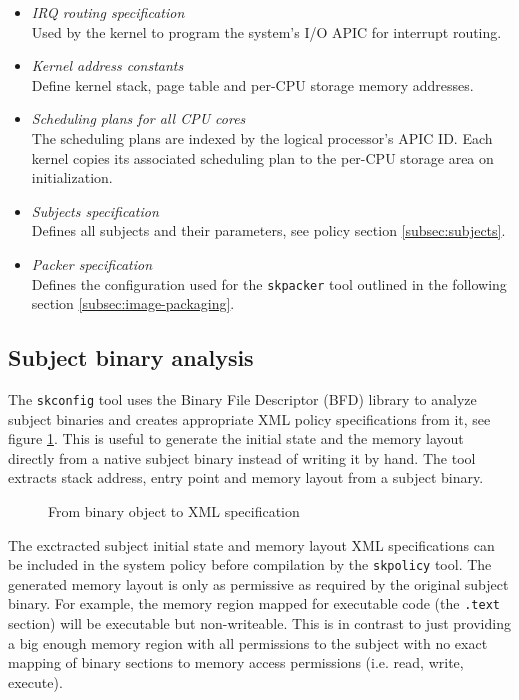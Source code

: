 \begin{itemize}
	\item \emph{IRQ routing specification}\\
		Used by the kernel to program the system's I/O APIC for interrupt
		routing.
	\item \emph{Kernel address constants}\\
		Define kernel stack, page table and per-CPU storage memory addresses.
	\item \emph{Scheduling plans for all CPU cores}\\
		The scheduling plans are indexed by the logical processor's APIC ID.
		Each kernel copies its associated scheduling plan to the per-CPU storage
		area on initialization.
	\item \emph{Subjects specification}\\
		Defines all subjects and their parameters, see policy section
		\ref{subsec:subjects}.
	\item \emph{Packer specification}\\
		Defines the configuration used for the \texttt{skpacker} tool outlined
		in the following section \ref{subsec:image-packaging}.
\end{itemize}

\subsection{Subject binary analysis}\label{subsec:subject-binary-analysis}
The \texttt{skconfig} tool uses the Binary File Descriptor (BFD)
library to analyze subject binaries and creates appropriate XML
policy specifications from it, see figure \ref{fig:object-analysis}. This is
useful to generate the initial state and the memory layout directly from a
native subject binary instead of writing it by hand. The tool extracts stack
address, entry point and memory layout from a subject binary.

\begin{figure}[h]
	\centering
	
	\caption{From binary object to XML specification}
	\label{fig:object-analysis}
\end{figure}

The exctracted subject initial state and memory layout XML specifications can be
included in the system policy before compilation by the \texttt{skpolicy} tool.
The generated memory layout is only as permissive as required by the original
subject binary. For example, the memory region mapped for executable code
(the \texttt{.text} section) will be executable but non-writeable. This is in
contrast to just providing a big enough memory region with all permissions to
the subject with no exact mapping of binary sections to memory access
permissions (i.e. read, write, execute).

